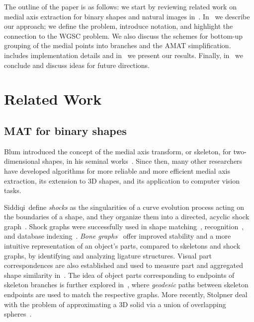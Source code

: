 \documentclass[10pt,twocolumn,letterpaper]{article}
\begin{document}
The outline of the paper is as follows: we start by reviewing related work on medial axis extraction for binary shapes
and natural images in~.
In~ we describe our approach; we define the problem, introduce notation, and highlight the connection to
the WGSC problem.
We also discuss the schemes for bottom-up grouping of the medial points into branches and the AMAT simplification.
~ includes implementation details and in~ we present our results.
Finally, in~ we conclude and discuss ideas for future directions.


\section{Related Work}\label{sec:related}
\subsection{MAT for binary shapes}\label{sec:related:binary}
Blum introduced the concept of the medial axis transform, or skeleton, for two-dimensional shapes,
in  his seminal works~\cite{blum1967transformation,blum1973biological}.
Since then, many other researchers have developed algorithms for more reliable
and more efficient medial axis extraction, its extension to 3D shapes, and its application
to computer vision tasks.

Siddiqi~\etal define \emph{shocks} as the singularities of a curve evolution process acting on the boundaries of
a shape, and they organize them into a directed, acyclic shock graph~\cite{siddiqi1999shock}.
Shock graphs were successfully used in shape matching~\cite{siddiqi1999shock}, recognition~\cite{sebastian2001recognition},
and database indexing~\cite{sebastian2002shock}.
\emph{Bone graphs}~\cite{macrini2008skeletons} offer improved stability and a more intuitive representation of an object's parts, 
compared to skeletons and shock graphs, by identifying and analyzing ligature structures.
Visual part correspondences are also established and used to measure part and aggregated shape similarity in~\cite{latecki2000shape}.
The idea of object parts corresponding to endpoints of skeleton branches is further explored in~\cite{bai2008path}, where
\emph{geodesic} paths between skeleton endpoints are used to match the respective graphs.
More recently, Stolpner \etal deal with the problem of approximating a 3D solid via a union
of overlapping spheres~\cite{stolpner2012medial}.
\end{document}
